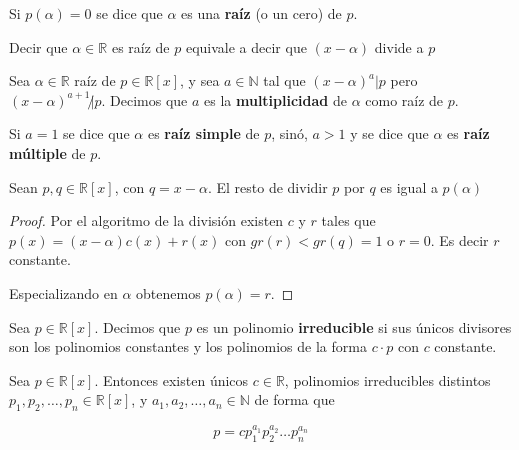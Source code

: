 \begin{definition} 

Si $p(\alpha) = 0$ se dice que $\alpha$ es una \textbf{raíz} (o un cero) de $p$.  

Decir que $\alpha \in \mathbb{R}$ es raíz de $p$ equivale a decir que $(x-\alpha)$ divide a $p$

Sea $\alpha \in \mathbb{R}$ raíz de $p \in \mathbb{R}[x]$, y sea $a \in \mathbb{N}$ tal que $(x-\alpha)^a | p$ pero $(x-\alpha)^{a+1} \not| p$.  Decimos que $a$ es la \textbf{multiplicidad} de $\alpha$ como raíz de $p$.

Si $a = 1$ se dice que $\alpha$ es \textbf{raíz simple} de $p$, sinó, $a>1$ y se dice que $\alpha$ es \textbf{raíz múltiple} de $p$.
\end{definition}


\begin{theorem} 
Sean $p, q \in \mathbb{R}[x]$, con $q = x - \alpha$.  El resto de dividir $p$ por $q$ es igual a $p(\alpha)$
\end{theorem}

\begin{proof}
Por el algoritmo de la división existen $c$ y $r$ tales que $p(x) = (x-\alpha) c(x) + r(x)$ con $gr(r) < gr(q) = 1$ o $r=0$.  Es decir $r$ constante.

Especializando en $\alpha$ obtenemos $p(\alpha) = r$.
\end{proof}

\begin{definition} 
Sea $p \in \mathbb{R}[x]$.  Decimos que $p$ es un polinomio \textbf{irreducible} si sus únicos divisores son los polinomios constantes y los polinomios de la forma $c \cdot p$ con $c$ constante.
\end{definition}

\begin{theorem} 

Sea $p \in \mathbb{R}[x]$.  Entonces existen únicos $c \in \mathbb{R}$, polinomios irreducibles distintos $p_1, p_2, \ldots, p_n \in \mathbb{R}[x]$, y $a_1, a_2, \ldots, a_n \in \mathbb{N}$ de forma que

$$ p = c p_1^{a_1} p_2^{a_2} \ldots p_n^{a_n} $$

\end{theorem}

